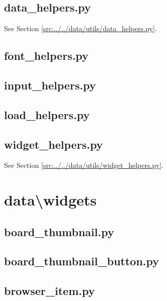 \documentclass[../main/main.tex]{subfiles}
\begin{document}
\subsection{data\_helpers.py}
See Section \ref{src:../../data/utils/data_helpers.py}.

\subsection{font\_helpers.py}

\label{src:data/utils/font_helpers.py}

\subsection{input\_helpers.py}

\label{src:data/utils/input_helpers.py}

\subsection{load\_helpers.py}

\label{src:data/utils/load_helpers.py}

\subsection{widget\_helpers.py}
See Section \ref{src:../../data/utils/widget_helpers.py}.

\section{data\textbackslash widgets}
\label{src:widgets}
\subsection{board\_thumbnail.py}

\label{src:data/widgets/board_thumbnail.py}

\subsection{board\_thumbnail\_button.py}

\label{src:data/widgets/board_thumbnail_button.py}

\subsection{browser\_item.py}

\label{src:data/widgets/browser_item.py}
\end{document}
